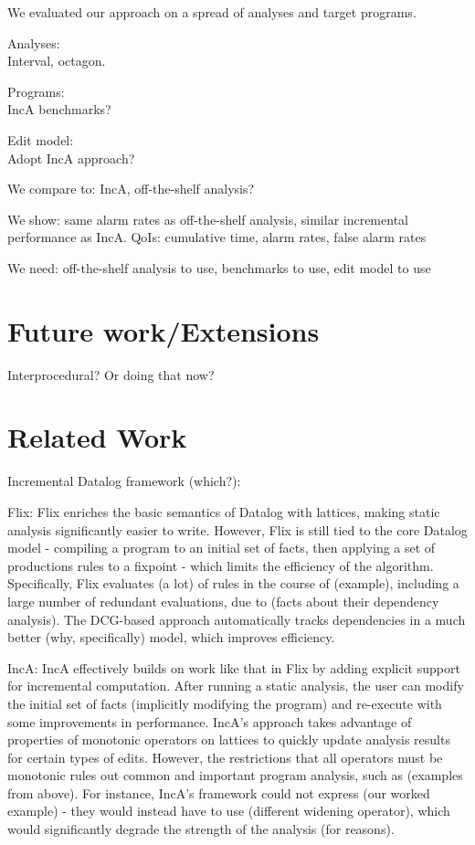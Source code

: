 \documentclass[acmlarge,anonymous]{acmart}\settopmatter{printfolios=true}
\begin{document}
We evaluated our approach on a spread of analyses and target programs.

Analyses:\\
Interval, octagon.

Programs:\\
IncA benchmarks?

Edit model:\\
Adopt IncA approach?

We compare to: IncA, off-the-shelf analysis?

We show: same alarm rates as off-the-shelf analysis, similar incremental performance as IncA. QoIs: cumulative time, alarm rates, false alarm rates

We need: off-the-shelf analysis to use, benchmarks to use, edit model to use

\section{Future work/Extensions}

Interprocedural? Or doing that now?

\section{Related Work}

Incremental Datalog framework (which?):

Flix: Flix enriches the basic semantics of Datalog with lattices, making static analysis significantly easier to write. However, Flix is still tied to the core Datalog model - compiling a program to an initial set of facts, then applying a set of productions rules to a fixpoint - which limits the efficiency of the algorithm. Specifically, Flix evaluates (a lot) of rules in the course of (example), including a large number of redundant evaluations, due to (facts about their dependency analysis). The DCG-based approach automatically tracks dependencies in a much better (why, specifically) model, which improves efficiency.

IncA: IncA effectively builds on work like that in Flix by adding explicit support for incremental computation. After running a static analysis, the user can modify the initial set of facts (implicitly modifying the program) and re-execute with some improvements in performance. IncA's approach takes advantage of properties of monotonic operators on lattices to quickly update analysis results for certain types of edits. However, the restrictions that all operators must be monotonic rules out common and important program analysis, such as (examples from above). For instance, IncA's framework could not express (our worked example) - they would instead have to use (different widening operator), which would significantly degrade the strength of the analysis (for reasons).
\end{document}
